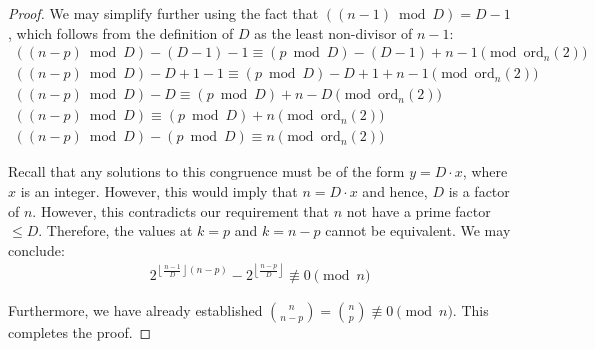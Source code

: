 \documentclass{article}
\theoremstyle{plain}
\theoremstyle{definition}
\newcommand{\ordn}[1]{\text{ord}_n(#1)}
\begin{document}
\begin{proof}
We may simplify further using the fact that $((n-1) \bmod{D}) = D-1$, which follows from the definition of $D$ as the least non-divisor of $n-1$:
\begin{align}
    ((n-p) \bmod{D}) - (D-1) - 1 \equiv (p \bmod{D}) - (D-1) + n - 1 \pmod{\ordn{2}} \\
    ((n-p) \bmod{D}) - D + 1 - 1 \equiv (p \bmod{D}) - D + 1 + n - 1 \pmod{\ordn{2}} \\
    ((n-p) \bmod{D}) - D \equiv (p \bmod{D}) + n - D \pmod{\ordn{2}} \\
    ((n-p) \bmod{D}) \equiv (p \bmod{D}) + n \pmod{\ordn{2}} \\
    ((n-p) \bmod{D}) - (p \bmod{D})\equiv n \pmod{\ordn{2}}
\end{align}

Recall that any solutions to this congruence must be of the form $y = D \cdot x$, where $x$ is an integer. However, this would imply that $n = D \cdot x$ and hence, $D$ is a factor of $n$. However, this contradicts our requirement that $n$ not have a prime factor $\leq D$. Therefore, the values at $k=p$ and $k=n-p$ cannot be equivalent. We may conclude:
\begin{align}
    2^{\left\lfloor \frac{n-1}{D} \right\rfloor (n-p)} - 2^{\left\lfloor \frac{n-p}{D} \right\rfloor} \not\equiv 0 \pmod{n}
\end{align}

Furthermore, we have already established $\binom{n}{n-p} = \binom{n}{p} \not\equiv 0 \pmod{n}$. This completes the proof.
\end{proof}
\end{document}

